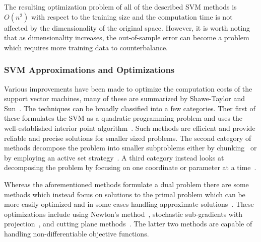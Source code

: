 The resulting optimization problem of all of the described SVM methods is $O(n^2)$ with respect to the training size and the computation time is not affected by the dimensionality of the original space.
%
However, it is worth noting that as dimensionality increases, the out-of-sample error can become a problem which requires more training data to counterbalance.

\subsubsection{SVM Approximations and Optimizations}

Various improvements have been made to optimize the computation costs of the support vector machines, many of these are summarized by Shawe-Taylor and Sun~\cite{Shawe-TaylorSun2011}.
%
The techniques can be broadly classified into a few categories.
%
Ther first of these formulates the SVM as a quadratic programming problem and uses the well-established interior point algorithm~\cite{BoydVandenberghe2004,FineScheinberg2002,FerrisMunson2002,ScholkopfSmola2001}.
%
Such methods are efficient and provide reliable and precise solutions for smaller sized problems.
%
The second category of methods decompose the problem into smaller subproblems either by chunking~\cite{BordesErtekinWeston2005,ChangLin2011,Joachims1999,OsunaFreundGirosi1997,Platt1998,Vapnik1982,ZanniSerafiniZanghirati2006} or by employing an active set strategy~\cite{CauwenberghsPoggio2000,HastieRossetTibshirani2004,Scheinberg2006,ShiltonPalaniswamiRalph2005}.
%
%
%
A third category instead looks at decomposing the problem by focusing on one
coordinate or parameter at a time~\cite{BordesBottouGallinari2007,FriessCristianiniCampbell1998,HsiehChangLin2008,MangasarianMusicant1999}.

Whereas the aforementioned methods formulate a dual problem there are some methods which instead focus on solutions to the primal problem which can be more easily optimized and in some cases handling approximate solutions~\cite{BottouBousquet2008,Shalev-ShwartzSingerSrebro2011}.
%
These optimizations include using Newton's method~\cite{Chapelle2007,KeerthiDeCoste2005,LeeMangasarian2001,Mangasarian2002}, stochastic sub-gradients with projection~\cite{KivinenSmolaWilliamson2004,Shalev-ShwartzSingerSrebro2011,Zhang2004}, and cutting plane methods~\cite{FrancSonnenburg2008,Joachims2006,TeoSmolaVishwanathan2007}.
%
The latter two methods are capable of handling non-differentiable objective functions.


